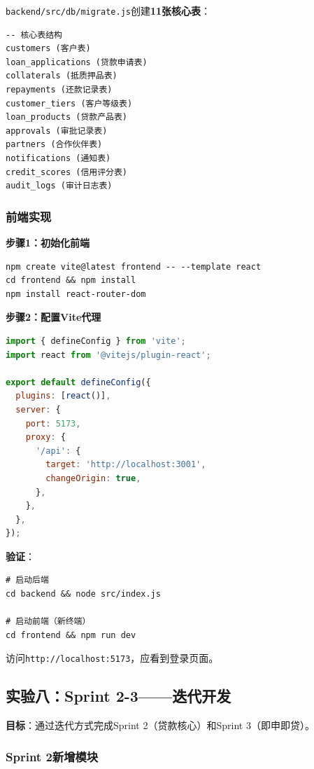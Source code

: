 \texttt{backend/src/db/migrate.js}创建\textbf{11张核心表}：

\begin{lstlisting}[style=shell]
-- 核心表结构
customers (客户表)
loan_applications (贷款申请表)
collaterals (抵质押品表)
repayments (还款记录表)
customer_tiers (客户等级表)
loan_products (贷款产品表)
approvals (审批记录表)
partners (合作伙伴表)
notifications (通知表)
credit_scores (信用评分表)
audit_logs (审计日志表)
\end{lstlisting}

\subsubsection*{前端实现}

\textbf{步骤1：初始化前端}

\begin{lstlisting}[style=shell]
npm create vite@latest frontend -- --template react
cd frontend && npm install
npm install react-router-dom
\end{lstlisting}

\textbf{步骤2：配置Vite代理}

\begin{lstlisting}[language=JavaScript]
import { defineConfig } from 'vite';
import react from '@vitejs/plugin-react';

export default defineConfig({
  plugins: [react()],
  server: {
    port: 5173,
    proxy: {
      '/api': {
        target: 'http://localhost:3001',
        changeOrigin: true,
      },
    },
  },
});
\end{lstlisting}

\textbf{验证}：

\begin{lstlisting}[style=shell]
# 启动后端
cd backend && node src/index.js

# 启动前端（新终端）
cd frontend && npm run dev
\end{lstlisting}

访问\texttt{http://localhost:5173}，应看到登录页面。

\subsection{实验八：Sprint 2-3——迭代开发}

\textbf{目标}：通过迭代方式完成Sprint 2（贷款核心）和Sprint 3（即申即贷）。

\subsubsection*{Sprint 2新增模块}

